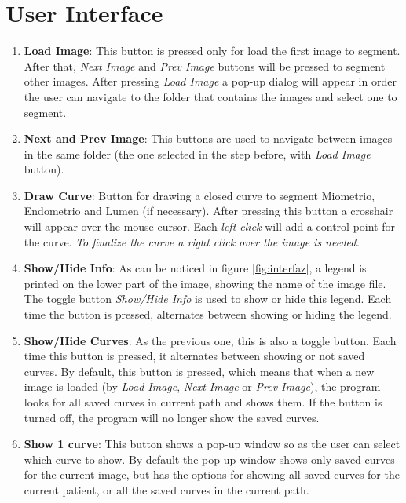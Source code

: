 \documentclass[12pt,a4paper,titlepage]{report}
\begin{document}
\section{User Interface}

\begin{enumerate}
	\item \textbf{Load Image}: This button is pressed only for load the first image to segment. After that, \emph{Next Image} and \emph{Prev Image} buttons will be pressed to segment other images. After pressing \emph{Load Image} a pop-up dialog will appear in order the user can navigate to the folder that contains the images and select one to segment.
	\item \textbf{Next and Prev Image}: This buttons are used to navigate between images in the same folder (the one selected in the step before, with \emph{Load Image} button).
	\item \textbf{Draw Curve}: Button for drawing a closed curve to segment Miometrio, Endometrio and Lumen (if necessary). After pressing this button a crosshair will appear over the mouse cursor. Each \emph{left click} will add a control point for the curve. 
	\emph{To finalize the curve a right click over the image is needed.}
	\item \textbf{Show/Hide Info}: As can be noticed in figure \ref{fig:interfaz}, a legend is printed on the lower part of the image, showing the name of the image file. The toggle button \emph{Show/Hide Info} is used to show or hide this legend. Each time the button is pressed, alternates between showing or hiding the legend.
	\item \textbf{Show/Hide Curves}: As the previous one, this is also a toggle button. Each time this button is pressed, it alternates between showing or not saved curves. By default, this button is pressed, which means that when a new image is loaded (by \emph{Load Image}, \emph{Next Image} or \emph{Prev Image}), the program looks for all saved curves in current path and shows them. If the button is turned off, the program will no longer show the saved curves.
	\item \textbf{Show 1 curve}: This button shows a pop-up window so as the user can select which curve to show. By default the pop-up window shows only saved curves for the current image, but has the options for showing all saved curves for the current patient, or all the saved curves in the current path.

\end{enumerate}
\end{document}
